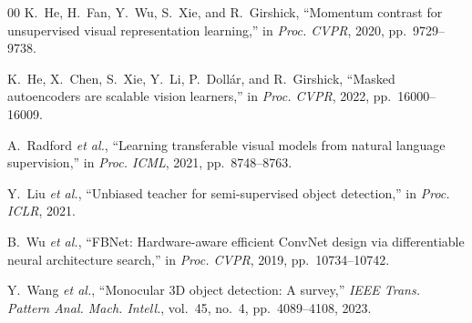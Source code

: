 \begin{thebibliography}{00}
K.~He, H.~Fan, Y.~Wu, S.~Xie, and R.~Girshick, ``Momentum contrast for
unsupervised visual representation learning,''
in \textit{Proc. CVPR}, 2020, pp.~9729--9738.

K.~He, X.~Chen, S.~Xie, Y.~Li, P.~Doll{\'a}r, and R.~Girshick, ``Masked
autoencoders are scalable vision learners,''
in \textit{Proc. CVPR}, 2022, pp.~16000--16009.

A.~Radford \textit{et al.}, ``Learning transferable visual models from natural
language supervision,'' in \textit{Proc. ICML}, 2021, pp.~8748--8763.

Y.~Liu \textit{et al.}, ``Unbiased teacher for semi-supervised object
detection,'' in \textit{Proc. ICLR}, 2021.

B.~Wu \textit{et al.}, ``FBNet: Hardware-aware efficient ConvNet design via
differentiable neural architecture search,''
in \textit{Proc. CVPR}, 2019, pp.~10734--10742.

Y.~Wang \textit{et al.}, ``Monocular 3D object detection: A survey,''
\textit{IEEE Trans. Pattern Anal. Mach. Intell.},
vol.~45, no.~4, pp.~4089--4108, 2023.

\end{thebibliography}



